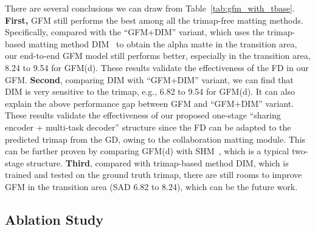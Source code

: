 \documentclass[twocolumn]{svjour3}
\begin{document}
There are several conclusions we can draw from Table~\ref{tab:gfm_with_tbase}. \textbf{First,} GFM still performs the best among all the trimap-free matting methods. Specifically, compared with the ``GFM+DIM'' variant, which uses the trimap-based matting method DIM~\citep{xu2017deep} to obtain the alpha matte in the transition area, our end-to-end GFM model still performs better, especially in the transition area,  8.24 to 9.54 for GFM(d). These results validate the effectiveness of the FD in our GFM. \textbf{Second}, comparing DIM with ``GFM+DIM'' variant, we can find that DIM is very sensitive to the trimap, e.g., 6.82 to 9.54 for GFM(d). It can also explain the above performance gap between GFM and ``GFM+DIM'' variant. These results validate the effectiveness of our proposed one-stage ``sharing encoder + multi-task decoder'' structure since the FD can be adapted to the predicted trimap from the GD, owing to the collaboration matting module. This can be further proven by comparing GFM(d) with SHM~\citep{chen2018semantic}, which is a typical two-stage structure. \textbf{Third}, compared with trimap-based method DIM, which is trained and tested on the ground truth trimap, there are still rooms to improve GFM in the transition area (SAD 6.82 to 8.24), which can be the future work.


\subsection{Ablation Study}
\end{document}
